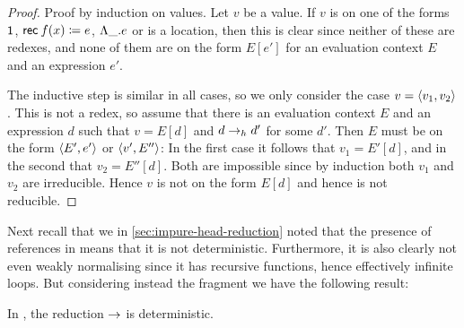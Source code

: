 \begin{proof}
    Proof by induction on values. Let $v$ be a value. If $v$ is on one of the forms $\mathsf{1}$, $\expRec{f}{x}{e}$, $\expForall{\alpha}{e}$ or is a location, then this is clear since neither of these are redexes, and none of them are on the form $E[e']$ for an evaluation context $E$ and an expression $e'$.

    The inductive step is similar in all cases, so we only consider the case $v = \langle\textcolor{black}{v_1},\textcolor{black}{v_2}\rangle$. This is not a redex, so assume that there is an evaluation context $E$ and an expression $d$ such that $v = E[d]$ and $d \to_h d'$ for some $d'$. Then $E$ must be on the form $\langle\textcolor{black}{E'},\textcolor{black}{e'}\rangle$ or $\langle\textcolor{black}{v'},\textcolor{black}{E''}\rangle$: In the first case it follows that $v_1 = E'[d]$, and in the second that $v_2 = E''[d]$. Both are impossible since by induction both $v_1$ and $v_2$ are irreducible. Hence $v$ is not on the form $E[d]$ and hence is not reducible.
\end{proof}


Next recall that we in \cref{sec:impure-head-reduction} noted that the presence of references in \langrecref{} means that it is not deterministic. Furthermore, it is also clearly not even weakly normalising since it has recursive functions, hence effectively infinite loops. But considering instead the fragment \langpure{} we have the following result:

\begin{theorem}[Determinism]
    \label{thm:F-determinism}
    In \langpure{}, the reduction $\to$ is deterministic.
\end{theorem}

